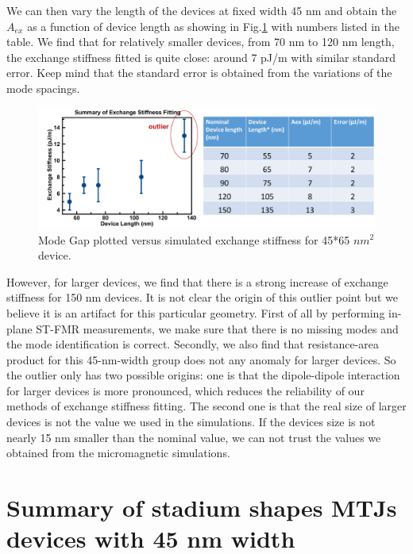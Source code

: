 We can then vary the length of the devices at fixed width 45 nm and obtain the $A_{ex}$ as a function of device length as showing in Fig.\ref{fig:4565ex} with numbers listed in the table. We find that for relatively smaller devices, from 70 nm to 120 nm length, the exchange stiffness fitted is quite close: around 7 pJ/m with similar standard error. Keep mind that the standard error is obtained from the variations of the mode spacings.

\begin{figure}[!ht]
  \centering
  \includegraphics[width=1.0\textwidth]{fig/stadium/60nmexsummary}
   \caption{Mode Gap plotted versus simulated exchange stiffness for 45*65 $nm^2$ device.}
  \label{fig:4565ex}
\end{figure}

However, for larger devices, we find that there is a strong increase of exchange stiffness for 150 nm devices. It is not clear the origin of this outlier point but we believe it is an artifact for this particular geometry. First of all by performing in-plane ST-FMR measurements, we make sure that there is no missing modes and the mode identification is correct. Secondly, we also find that resistance-area product for this 45-nm-width group does not any anomaly for larger devices. So the outlier only has two possible origins: one is that the dipole-dipole interaction for larger devices is more pronounced, which reduces the reliability of our methods of exchange stiffness fitting. The second one is that the real size of larger devices is not the value we used in the simulations. If the devices size is not nearly 15 nm smaller than the nominal value, we can not trust the values we obtained from the micromagnetic simulations.

\clearpage


\section{Summary of stadium shapes MTJs devices with 45 nm width}

